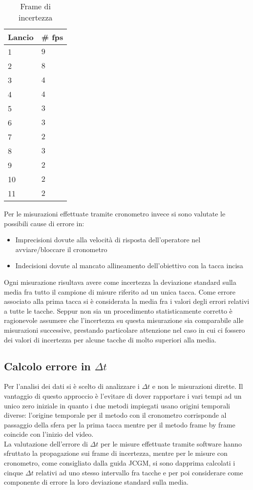 \documentclass[a4paper,11pt,oneside]{article}
\begin{document}
\begin{table}[]
\caption{Frame di incertezza}
\label{tab:frame_incertezza}
\begin{tabular}{ll}
Lancio & \# fps  \\ \hline
1      & $9$ \\ \hline
2      & $8$ \\ \hline
3      & $4$ \\ \hline
4      & $4$ \\ \hline
5      & $3$ \\ \hline
6      & $3$ \\ \hline
7      & $2$ \\ \hline
8      & $3$ \\ \hline
9      & $2$ \\ \hline
10     & $2$ \\ \hline
11     & $2$
\end{tabular}
\end{table}


Per le misurazioni effettuate tramite cronometro invece si sono valutate le possibili cause di errore in:
\begin{itemize}
    \item Imprecisioni dovute alla velocità di risposta dell'operatore nel avviare/bloccare il cronometro
    \item Indecisioni dovute al mancato allineamento dell'obiettivo con la tacca incisa
\end{itemize}
Ogni misurazione risultava avere come incertezza la deviazione standard sulla media fra tutto il campione di misure riferito ad un unica tacca. Come errore associato alla prima tacca si è considerata la media fra i valori degli errori relativi a tutte le tacche.
Seppur non sia un procedimento statisticamente corretto è ragionevole assumere che l'incertezza su questa misurazione sia comparabile alle misurazioni successive, prestando particolare attenzione nel caso in cui ci fossero dei valori di incertezza per alcune tacche di molto superiori alla media. 


\subsection*{Calcolo errore in $\Delta t$}
Per l'analisi dei dati si è scelto di analizzare i $\Delta t$ e non le misurazioni dirette. Il vantaggio di questo approccio è l'evitare di dover rapportare i vari tempi ad un unico zero iniziale in quanto i due metodi impiegati usano origini temporali diverse: l'origine temporale per il metodo con il cronometro corrisponde al passaggio della sfera per la prima tacca mentre per il metodo frame by frame coincide con l'inizio del video.\\
La valutazione dell'errore di $\Delta t$ per le misure effettuate tramite software hanno sfruttato la propagazione sui frame di incertezza, mentre per le misure con cronometro, come consigliato dalla guida JCGM, si sono dapprima calcolati i cinque $\Delta t$ relativi ad uno stesso intervallo fra tacche e per poi considerare come componente di errore la loro deviazione standard sulla media.
\end{document}
